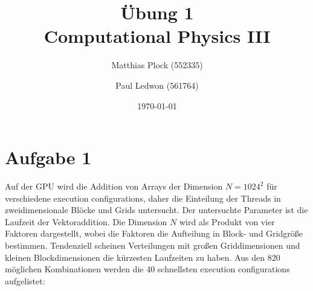 \documentclass[10pt,a4paper]{article}
\title{Übung 1 \\Computational Physics III}
\author{Matthias Plock (552335) \and Paul Ledwon (561764)} %
\date{\today}
\begin{document}
\maketitle
\tableofcontents

\pagestyle{myheadings}                  %

\section{Aufgabe 1}

Auf der GPU wird die Addition von Arrays der Dimension $N=1024^2$ für verschiedene execution configurations, daher die Einteilung der Threads in zweidimensionale Blöcke und Grids untersucht. Der untersuchte Parameter ist die Laufzeit der Vektoraddition. 
Die Dimension $N$ wird als Produkt von vier Faktoren dargestellt, wobei die Faktoren die 
Aufteilung in Block- und Gridgröße bestimmen. 
Tendenziell scheinen Verteilungen mit großen Griddimensionen und kleinen Blockdimensionen die kürzesten Laufzeiten zu haben.
Aus den 820 möglichen Kombinationen werden die 40 schnellsten execution configurations aufgelistet:
\end{document}
